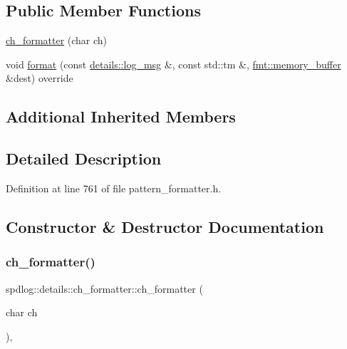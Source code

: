 \subsection*{Public Member Functions}
\begin{DoxyCompactItemize}
\item 
\hyperlink{classspdlog_1_1details_1_1ch__formatter_a0ea7f88fed22209cce188238bf103a35}{ch\+\_\+formatter} (char ch)
\item 
void \hyperlink{classspdlog_1_1details_1_1ch__formatter_a11cf092c89041ff6186efb4324227cdb}{format} (const \hyperlink{structspdlog_1_1details_1_1log__msg}{details\+::log\+\_\+msg} \&, const std\+::tm \&, \hyperlink{format_8h_a21cbf729f69302f578e6db21c5e9e0d2}{fmt\+::memory\+\_\+buffer} \&dest) override
\end{DoxyCompactItemize}
\subsection*{Additional Inherited Members}


\subsection{Detailed Description}


Definition at line 761 of file pattern\+\_\+formatter.\+h.



\subsection{Constructor \& Destructor Documentation}
\mbox{\label{classspdlog_1_1details_1_1ch__formatter_a0ea7f88fed22209cce188238bf103a35}} 
\subsubsection{\texorpdfstring{ch\+\_\+formatter()}{ch\_formatter()}}
{\footnotesize\ttfamily spdlog\+::details\+::ch\+\_\+formatter\+::ch\+\_\+formatter (\begin{DoxyParamCaption}\item[{char}]{ch }\end{DoxyParamCaption})\hspace{0.3cm}{\ttfamily [inline]}, {\ttfamily [explicit]}}



